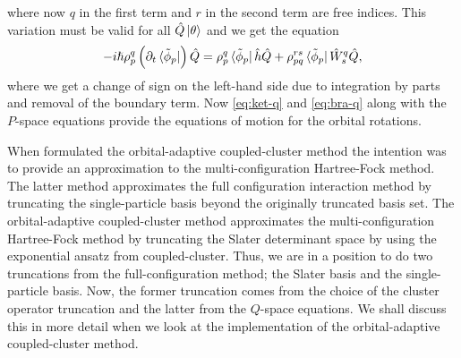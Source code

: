             where now $q$ in the first term and $r$ in the second term are free
            indices.
            This variation must be valid for all $\hat{Q}\ket{\theta}$ and we
            get the equation
            \begin{align}
                -i\hslash\rho^{q}_{p}\left( 
                    \partial_t \bra*{\tilde{\phi}_p}
                 \right)\hat{Q}
                =
                \rho^{q}_{p}\bra*{\tilde{\phi}_p}
                \hat{h}\hat{Q}
                + \rho^{rs}_{pq}
                \bra*{\tilde{\phi}_p}
                \hat{W}^{q}_{s}\hat{Q},
                \label{eq:bra-q}
            \end{align}
            where we get a change of sign on the left-hand side due to
            integration by parts and removal of the boundary term.
            Now \autoref{eq:ket-q} and \autoref{eq:bra-q} along with the
            $P$-space equations provide the equations of motion for the orbital
            rotations.

            When \citeauthor{kvaal2012ab} formulated the orbital-adaptive
            coupled-cluster method the intention was to provide an approximation
            to the multi-configuration Hartree-Fock method.
            The latter method approximates the full configuration interaction
            method by truncating the single-particle basis beyond the originally
            truncated basis set.
            The orbital-adaptive coupled-cluster method approximates the
            multi-configuration Hartree-Fock method by truncating the Slater
            determinant space by using the exponential ansatz from
            coupled-cluster.
            Thus, we are in a position to do two truncations from the
            full-configuration method; the Slater basis and the single-particle
            basis.
            Now, the former truncation comes from the choice of the cluster
            operator truncation and the latter from the $Q$-space equations.
            We shall discuss this in more detail when we look at the
            implementation of the orbital-adaptive coupled-cluster method.




